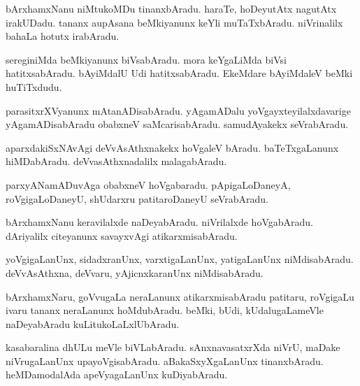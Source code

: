 \documentclass{article}
\begin{document}
\begin{mn}
bArxhamxNanu niMtukoMDu tinanxbAradu. haraTe, hoDeyutAtx nagutAtx irakUDadu. tananx aupAsana 
beMkiyanunx keYli muTaTxbAradu. niVrinalilx bahaLa hotutx irabAradu.
\end{mn}

\begin{mn}
sereginiMda beMkiyanunx biVsabAradu. mora keYgaLiMda biVsi hatitxsabAradu. bAyiMdalU Udi 
hatitxsabAradu. EkeMdare bAyiMdaleV beMki huTiTxdudu.
\end{mn}

\begin{mn}
parasitxrXVyanunx mAtanADisabAradu. yAgamADalu yoVgayxteyilalxdavarige yAgamADisabAradu obabxneV 
saMcarisabAradu. samudAyakekx seVrabAradu.
\end{mn}

\begin{mn}
aparxdakiSxNAvAgi deVvAsAthxnakekx hoVgaleV bAradu. baTeTxgaLanunx hiMDabAradu. 
deVvasAthxnadalilx malagabAradu.
\end{mn}

\begin{mn}
parxyANamADuvAga obabxneV hoVgabaradu. pApigaLoDaneyA, roVgigaLoDaneyU, shUdarxru patitaroDaneyU 
seVrabAradu.

\end{mn}

\begin{mn}
bArxhamxNanu keravilalxde naDeyabAradu. niVrilalxde hoVgabAradu. dAriyalilx citeyanunx savayxvAgi 
atikarxmisabAradu.
\end{mn}

\begin{mn}
yoVgigaLanUnx, sidadxranUnx, varxtigaLanUnx, yatigaLanUnx niMdisabAradu. deVvAsAthxna, deVvaru, 
yAjicnxkaranUnx niMdisabAradu.
\end{mn}

\begin{mn}
bArxhamxNaru, goVvugaLa neraLanunx atikarxmisabAradu patitaru, roVgigaLu ivaru tananx neraLanunx 
hoMdubAradu. beMki, bUdi, kUdalugaLameVle naDeyabAradu kuLitukoLaLxlUbAradu.
\end{mn}

\begin{mn}
kasabaralina dhULu meVle biVLabAradu. sAnxnavasatxrXda niVrU, maDake niVrugaLanUnx 
upayoVgisabAradu. aBakaSxyXgaLanUnx tinanxbAradu. heMDamodalAda apeVyagaLanUnx kuDiyabAradu.
\end{mn}

\end{document}
